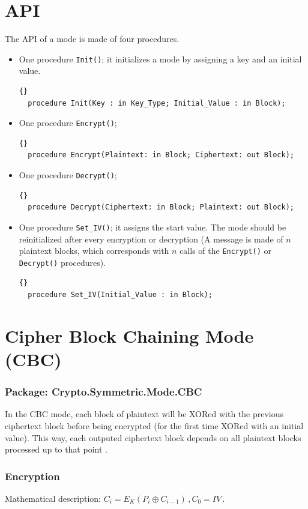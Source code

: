 \section{API}\label{API-Mode}
The API of a mode is made of four procedures.
\begin{itemize}
\item One procedure \texttt{Init()}; it initializes a mode by
  assigning a key and an initial value.
\begin{lstlisting}{}
  procedure Init(Key : in Key_Type; Initial_Value : in Block);
\end{lstlisting}
\item One procedure \texttt{Encrypt()};
\begin{lstlisting}{}
  procedure Encrypt(Plaintext: in Block; Ciphertext: out Block);
\end{lstlisting}
\item One procedure \texttt{Decrypt()};
\begin{lstlisting}{}
  procedure Decrypt(Ciphertext: in Block; Plaintext: out Block);
\end{lstlisting}
\item One procedure \texttt{Set\_IV()}; it assigns the start
  value. The mode should be reinitialized after every encryption or
  decryption (A message is made of $n$ plaintext blocks, which
  corresponds with $n$ calls of the \texttt{Encrypt()} or
  \texttt{Decrypt()} procedures).
\begin{lstlisting}{}
  procedure Set_IV(Initial_Value : in Block);
\end{lstlisting}
\end{itemize}


\section{Cipher Block Chaining Mode (CBC)}
\subsubsection*{Package: Crypto.Symmetric.Mode.CBC}
In the CBC mode, each block of plaintext will be XORed with the
previous ciphertext block before being encrypted (for the first time
XORed with an initial value). This way, each outputed ciphertext block
depends on all plaintext blocks processed up to that point
\cite{DBLP:reference/crypt/2011}.
\subsubsection*{Encryption}
Mathematical description: $C_i=E_K(P_i\oplus C_{i-1})\,, C_0=IV$\,.

